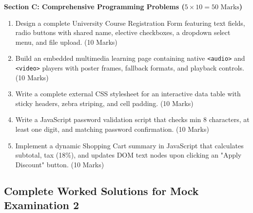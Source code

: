 \begin{mockexam}
\medskip
\noindent\textbf{Section C: Comprehensive Programming Problems ($5 \times 10 = 50\text{ Marks}$)}
\begin{enumerate}[leftmargin=1.5em, start=17]
    \item Design a complete University Course Registration Form featuring text fields, radio buttons with shared name, elective checkboxes, a dropdown select menu, and file upload. (10 Marks)
    \item Build an embedded multimedia learning page containing native \texttt{<audio>} and \texttt{<video>} players with poster frames, fallback formats, and playback controls. (10 Marks)
    \item Write a complete external CSS stylesheet for an interactive data table with sticky headers, zebra striping, and cell padding. (10 Marks)
    \item Write a JavaScript password validation script that checks min 8 characters, at least one digit, and matching password confirmation. (10 Marks)
    \item Implement a dynamic Shopping Cart summary in JavaScript that calculates subtotal, tax (18\%), and updates DOM text nodes upon clicking an "Apply Discount" button. (10 Marks)
\end{enumerate}
\end{mockexam}

\subsection{Complete Worked Solutions for Mock Examination 2}

